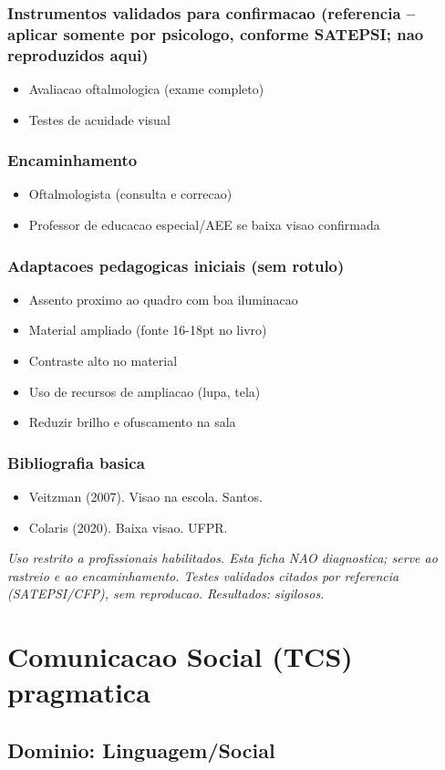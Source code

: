 \documentclass[a4paper,11pt]{book}
\newcommand{\avisolegal}{\par\medskip\noindent\footnotesize\itshape
\color{cinza}Uso restrito a profissionais habilitados. Esta ficha NAO diagnostica;
serve ao rastreio e ao encaminhamento. Testes validados citados por referencia
(SATEPSI/CFP), sem reproducao. Resultados: sigilosos.\color{black}\par}
\begin{document}
\subsection*{Instrumentos validados para confirmacao (referencia -- aplicar somente por psicologo, conforme SATEPSI; nao reproduzidos aqui)}
\begin{itemize}
\item Avaliacao oftalmologica (exame completo)
\item Testes de acuidade visual
\end{itemize}
\subsection*{Encaminhamento}
\begin{itemize}
\item Oftalmologista (consulta e correcao)
\item Professor de educacao especial/AEE se baixa visao confirmada
\end{itemize}
\subsection*{Adaptacoes pedagogicas iniciais (sem rotulo)}
\begin{itemize}
\item Assento proximo ao quadro com boa iluminacao
\item Material ampliado (fonte 16-18pt no livro)
\item Contraste alto no material
\item Uso de recursos de ampliacao (lupa, tela)
\item Reduzir brilho e ofuscamento na sala
\end{itemize}
\subsection*{Bibliografia basica}
\begin{itemize}
\item Veitzman (2007). Visao na escola. Santos.
\item Colaris (2020). Baixa visao. UFPR.
\end{itemize}
\avisolegal


\chapter{Comunicacao Social (TCS) pragmatica}
\section*{Dominio: Linguagem/Social}
\end{document}
